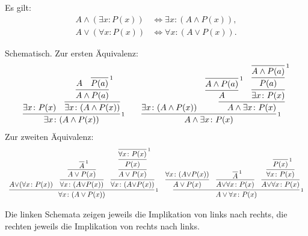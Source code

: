 \begin{Satz}%
\label{general-dl}
Es gilt:
\begin{align*}
A\land (\exists x\colon P(x)) &\iff \exists x\colon (A\land P(x)),\\
A\lor (\forall x\colon P(x)) &\iff \forall x\colon (A\lor P(x)).
\end{align*}
\end{Satz}
\begin{Beweis}[Beweis]
Schematisch. Zur ersten Äquivalenz:
\[\begin{array}{c@{\qquad}c}
\infer[\infernote{1}]{\exists x\colon (A\land P(x))}{
  \exists x\colon P(x)
& \infer{\exists x\colon (A\land P(x))}{
    \infer{A\land P(a)}{A & \infer[\infernote{1}]{P(a)}{}}}}
&
\infer[\infernote{1}]{A\land\exists x\colon P(x)}{
  \exists x\colon (A\land P(x))
& \infer{A\land \exists x\colon P(x)}{
    \infer{A}{\infer[\infernote{1}]{A\land P(a)}{}}
  & \infer{\exists x\colon P(x)}{
      \infer{P(a)}{\infer[\infernote{1}]{A\land P(a)}{}}}}}
\end{array}\]
Zur zweiten Äquivalenz:
{\small
\[\begin{array}{c@{\quad}c}
\infer[\infernote{1}]{\forall x\colon (A\lor P(x))}{
A{\lor}(\forall x\colon P(x))
& \infer{\forall x\colon (A{\lor}P(x))}{
    \infer{A\lor P(x)}{\infer[\infernote{1}]{A}{}}
  }
& \infer{\forall x\colon (A{\lor}P(x))}{
    \infer{A\lor P(x)}{
      \infer{P(x)}{\infer[\infernote{1}]{\forall x\colon P(x)}{}}
    }
  }
}
&
\infer[\infernote{1}]{A\lor\forall x\colon P(x)}{
  \infer{A\lor P(x)}{\forall x\colon (A{\lor}P(x))}
  & \infer{A{\lor}\forall x\colon P(x)}{
      \infer[\infernote{1}]{A}{}}
  & \infer{A{\lor}\forall x\colon P(x)}{
      \infer{\forall x\colon P(x)}{
        \infer[\infernote{1}]{P(x)}{}}}
}
\end{array}\]
}

\noindent
Die linken Schemata zeigen jeweils die Implikation von links nach
rechts, die rechten jeweils die Implikation von rechts nach
links.\,\qedsymbol
\end{Beweis}

